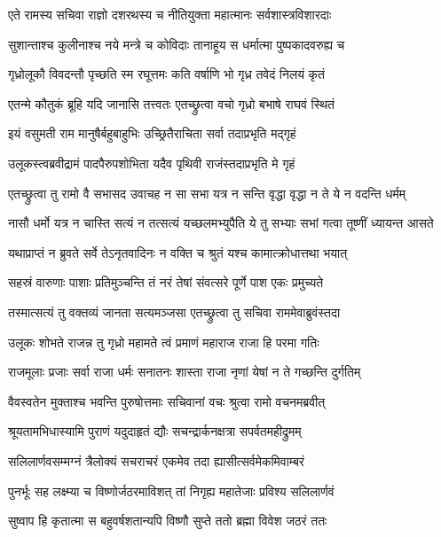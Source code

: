 \twolineshloka
{एते रामस्य सचिवा राज्ञो दशरथस्य च}
{नीतियुक्ता महात्मानः सर्वशास्त्रविशारदाः}%

\twolineshloka
{सुशान्ताश्च कुलीनाश्च नये मन्त्रे च कोविदाः}
{तानाहूय स धर्मात्मा पुष्पकादवरुह्य च}%

\twolineshloka
{गृध्रोलूकौ विवदन्तौ पृच्छति स्म रघूत्तमः}
{कति वर्षाणि भो गृध्र तवेदं निलयं कृतं}%

\twolineshloka
{एतन्मे कौतुकं ब्रूहि यदि जानासि तत्त्वतः}
{एतच्छ्रुत्वा वचो गृध्रो बभाषे राघवं स्थितं}%

\twolineshloka
{इयं वसुमती राम मानुषैर्बहुबाहुभिः}
{उच्छ्रितैराचिता सर्वा तदाप्रभृति मद्गृहं}%

\twolineshloka
{उलूकस्त्वब्रवीद्रामं पादपैरुपशोभिता}
{यदैव पृथिवी राजंस्तदाप्रभृति मे गृहं}%

\twolineshloka
{एतच्छ्रुत्वा तु रामो वै सभासद उवाचह}
{न सा सभा यत्र न सन्ति वृद्धा वृद्धा न ते ये न वदन्ति धर्मम्}%

\twolineshloka
{नासौ धर्मो यत्र न चास्ति सत्यं न तत्सत्यं यच्छलमभ्युपैति}
{ये तु सभ्याः सभां गत्वा तूष्णीं ध्यायन्त आसते}%

\twolineshloka
{यथाप्राप्तं न ब्रुवते सर्वे तेऽनृतवादिनः}
{न वक्ति च श्रुतं यश्च कामात्क्रोधात्तथा भयात्}%

\twolineshloka
{सहस्रं वारुणाः पाशाः प्रतिमुञ्चन्ति तं नरं}
{तेषां संवत्सरे पूर्णे पाश एकः प्रमुच्यते}%

\twolineshloka
{तस्मात्सत्यं तु वक्तव्यं जानता सत्यमञ्जसा}
{एतच्छ्रुत्वा तु सचिवा राममेवाब्रुवंस्तदा}%

\twolineshloka
{उलूकः शोभते राजन्न तु गृध्रो महामते}
{त्वं प्रमाणं महाराज राजा हि परमा गतिः}%

\twolineshloka
{राजमूलाः प्रजाः सर्वा राजा धर्मः सनातनः}
{शास्ता राजा नृणां येषां न ते गच्छन्ति दुर्गतिम्}%

\twolineshloka
{वैवस्वतेन मुक्ताश्च भवन्ति पुरुषोत्तमाः}
{सचिवानां वचः श्रुत्वा रामो वचनमब्रवीत्}%

\twolineshloka
{श्रूयतामभिधास्यामि पुराणं यदुदाहृतं}
{द्यौः सचन्द्रार्कनक्षत्रा सपर्वतमहीद्रुमम्}%

\twolineshloka
{सलिलार्णवसम्मग्नं त्रैलोक्यं सचराचरं}
{एकमेव तदा ह्यासीत्सर्वमेकमिवाम्बरं}%

\twolineshloka
{पुनर्भूः सह लक्ष्म्या च विष्णोर्जठरमाविशत्}
{तां निगृह्य महातेजाः प्रविश्य सलिलार्णवं}%

\twolineshloka
{सुष्वाप हि कृतात्मा स बहुवर्षशतान्यपि}
{विष्णौ सुप्ते ततो ब्रह्मा विवेश जठरं ततः}%

